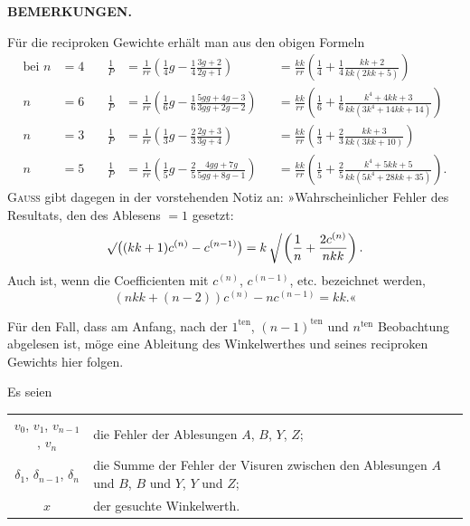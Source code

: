 \par\clearpage
\noindent{}\hfill{\small\textbf{BEMERKUNGEN.}}\hfill\null\par\medskip

Für die reciproken Gewichte erhält man aus den obigen Formeln
\[
\begin{alignedat}{3}
 \text{bei }n&=4\quad&
 \frac{1}{P}&=\frac{1}{rr}\left(\tfrac14g-\tfrac14\frac{3g+2}{2g+1}\right)&
 &=\frac{kk}{rr}\left(\tfrac14+\tfrac14\frac{kk+2}{kk(2kk+5)}\right)\\
 n&=6&
 \frac{1}{P}&=\frac{1}{rr}\left(\tfrac16g-\tfrac16\frac{5gg+4g-3}{3gg+2g-2}\right)&
 &=\frac{kk}{rr}\left(\tfrac16+\tfrac16\frac{k^4+4kk+3}{kk(3k^4+14kk+14)}\right)\\
 n&=3&
 \frac{1}{P}&=\frac{1}{rr}\left(\tfrac13g-\tfrac23\frac{2g+3}{3g+4}\right)&
 &=\frac{kk}{rr}\left(\tfrac13+\tfrac23\frac{kk+3}{kk(3kk+10)}\right)\\
 n&=5&
 \frac{1}{P}&=\frac{1}{rr}\left(\tfrac15g-\tfrac25\frac{4gg+7g}{5gg+8g-1}\right)&
 &=\frac{kk}{rr}\left(\tfrac15+\tfrac25\frac{k^4+5kk+5}{kk(5k^4+28kk+35)}\right).
\end{alignedat}
\]
\textsc{Gauss} gibt dagegen in der vorstehenden Notiz an: »Wahrscheinlicher Fehler des Resultats, den des Ablesens $=1$ gesetzt:
\[
 \surd\bigl((kk+1)c^{(n)}-c^{(n-1)}\bigr)
 =k\left\delimiter"270370\relax\vphantom{\frac{1}{n}}\right.\!
 \left(\frac{1}{n}+\frac{2c^{(n)}}{nkk}\right).
\]
\indent Auch ist, wenn die Coefficienten mit $c^{(n)}$, $c^{(n-1)}$, etc. bezeichnet werden,
\[
 (nkk+(n-2))c^{(n)}-nc^{(n-1)}=kk.\text{«}
\]

Für den Fall, dass am Anfang, nach der $1^{\text{ten}}$, $(n-1)^{\text{ten}}$ und $n^{\text{ten}}$ Beobachtung abgelesen ist, möge eine Ableitung des Winkelwerthes und seines reciproken Gewichts hier folgen.

Es seien\par
\noindent
\begin{tabular}{@{}c@{\quad}p{.80\linewidth}@{}}
 $v_0$, $v_1$, $v_{n-1}$, $v_n$ & die Fehler der Ablesungen $A$, $B$, $Y$, $Z$;\\
 $\delta_1$, $\delta_{n-1}$, $\delta_n$ & die Summe der Fehler der Visuren zwischen den Ablesungen $A$ und $B$, $B$ und $Y$, $Y$ und $Z$;\\
 $x$ & der gesuchte Winkelwerth.
\end{tabular}\par

